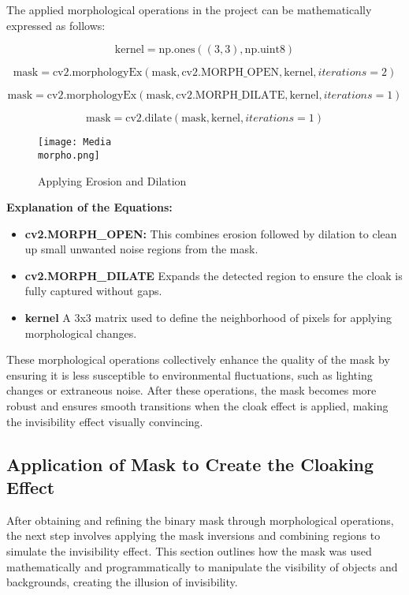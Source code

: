 \documentclass[onecolumn]{article} %
\begin{document}
The applied morphological operations in the project can be mathematically expressed as follows:

\[
\text{kernel} = \text{np.ones}((3, 3), \text{np.uint8})
\]

\[
\text{mask} = \text{cv2.morphologyEx}(\text{mask}, \text{cv2.MORPH\_OPEN}, \text{kernel}, iterations=2)
\]

\[
\text{mask} = \text{cv2.morphologyEx}(\text{mask}, \text{cv2.MORPH\_DILATE}, \text{kernel}, iterations=1)
\]

\[
\text{mask} = \text{cv2.dilate}(\text{mask}, \text{kernel}, iterations=1)
\]

\begin{figure}[h!]
    \centering
    \texttt{[image: Media\\morpho.png]}
    \caption{Applying Erosion and Dilation}
    \label{fig:Morpho}
\end{figure}
\textbf{Explanation of the Equations:}  
\begin{itemize}
    \item \textbf{cv2.MORPH\_OPEN:} This combines erosion followed by dilation to clean up small unwanted noise regions from the mask.
    \item \textbf{cv2.MORPH\_DILATE}\: Expands the detected region to ensure the cloak is fully captured without gaps.
    \item \textbf{kernel}\: A 3x3 matrix used to define the neighborhood of pixels for applying morphological changes.
\end{itemize}

These morphological operations collectively enhance the quality of the mask by ensuring it is less susceptible to environmental fluctuations, such as lighting changes or extraneous noise. After these operations, the mask becomes more robust and ensures smooth transitions when the cloak effect is applied, making the invisibility effect visually convincing.

\subsection{Application of Mask to Create the Cloaking Effect}

After obtaining and refining the binary mask through morphological operations, the next step involves applying the mask inversions and combining regions to simulate the invisibility effect. This section outlines how the mask was used mathematically and programmatically to manipulate the visibility of objects and backgrounds, creating the illusion of invisibility.
\end{document}
